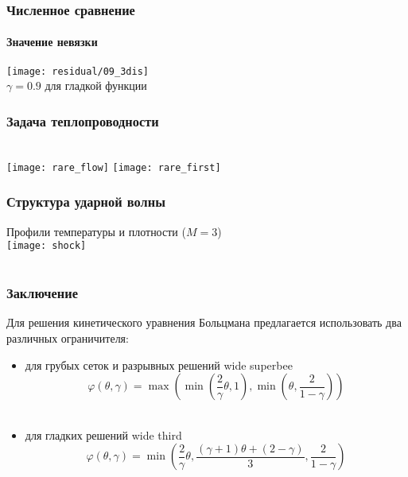 \documentclass[ucs]{beamer}
\begin{document}
\begin{frame}
	\frametitle{Численное сравнение}
	\framesubtitle{Значение невязки}
	\begin{center}
		\texttt{[image: residual/09\_3dis]}\\
		\(\gamma=0.9\) для гладкой функции
	\end{center}
\end{frame}

\begin{frame}
	\frametitle{Задача теплопроводности}
	 \\
	\texttt{[image: rare\_flow]}
	\texttt{[image: rare\_first]}
\end{frame}

\begin{frame}
	\frametitle{Структура ударной волны}
	\centering
	 \begin{center}
	    Профили температуры и плотности (\(M=3\)) \\
	    \texttt{[image: shock]}
	 \end{center}
 
\end{frame}

\section*{}
\begin{frame}
	\frametitle{Заключение}
	Для решения кинетического уравнения Больцмана предлагается использовать два различных ограничителя:
	\begin{itemize}
		\item для \alert{грубых} сеток и \alert{разрывных} решений \alert{wide superbee}
			\[ \varphi(\theta,\gamma) = \max\left(\min\left(\dfrac2{\gamma}\theta,1\right),\min\left(\theta,\dfrac2{1-\gamma}\right)\right) \] \\
		\item для \alert{гладких} решений \alert{wide third} 
			\[ \varphi(\theta,\gamma) = \min\left(\dfrac2{\gamma}\theta,\dfrac{(\gamma+1)\theta+(2-\gamma)}{3},\dfrac2{1-\gamma}\right) \] \\
	\end{itemize}

\end{frame}
\end{document}
